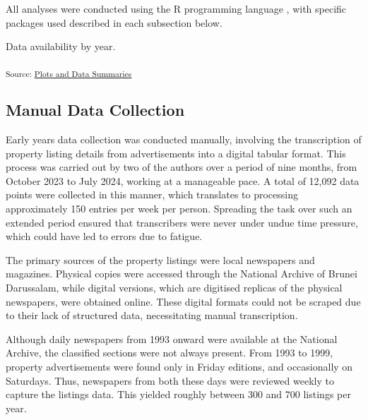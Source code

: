 \documentclass[
  number]{elsarticle}
\begin{document}
All analyses were conducted using the R programming language
\citep{rcoreteam2024language}, with specific packages used described in
each subsection below.

\begin{table}

\caption{\label{tbl-avail}Data availability by year.}

\centering{

}

\end{table}%

\textsubscript{Source:
\href{https://Bruneiverse.github.io/house-data/notebooks/analysis-preview.html\#cell-tbl-avail}{Plots
and Data Summaries}}

\subsection{Manual Data Collection}\label{manual-data-collection}

Early years data collection was conducted manually, involving the
transcription of property listing details from advertisements into a
digital tabular format. This process was carried out by two of the
authors over a period of nine months, from October 2023 to July 2024,
working at a manageable pace. A total of 12,092 data points were
collected in this manner, which translates to processing approximately
150 entries per week per person. Spreading the task over such an
extended period ensured that transcribers were never under undue time
pressure, which could have led to errors due to fatigue.

The primary sources of the property listings were local newspapers and
magazines. Physical copies were accessed through the National Archive of
Brunei Darussalam, while digital versions, which are digitised replicas
of the physical newspapers, were obtained online. These digital formats
could not be scraped due to their lack of structured data, necessitating
manual transcription.

Although daily newspapers from 1993 onward were available at the
National Archive, the classified sections were not always present. From
1993 to 1999, property advertisements were found only in Friday
editions, and occasionally on Saturdays. Thus, newspapers from both
these days were reviewed weekly to capture the listings data. This
yielded roughly between 300 and 700 listings per year.
\end{document}
